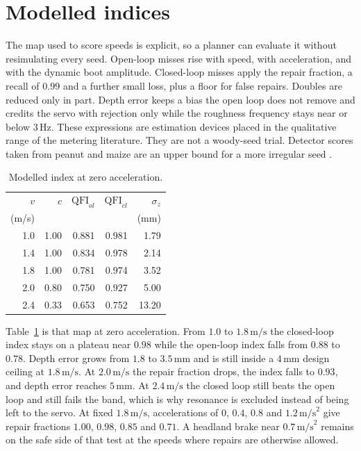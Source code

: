 \documentclass[11pt,a4paper]{article}
\begin{document}
\section{Modelled indices}
The map used to score speeds is explicit, so a planner can evaluate it without resimulating every seed. Open-loop misses rise with speed, with acceleration, and with the dynamic boot amplitude. Closed-loop misses apply the repair fraction, a recall of \(0.99\) and a further small loss, plus a floor for false repairs. Doubles are reduced only in part. Depth error keeps a bias the open loop does not remove and credits the servo with rejection only while the roughness frequency stays near or below \(3\,\mathrm{Hz}\). These expressions are estimation devices placed in the qualitative range of the metering literature. They are not a woody-seed trial. Detector scores taken from peanut and maize are an upper bound for a more irregular seed \cite{blaser2024,zhao2025yolo}.

\begin{table}[t]
\centering
\caption{Modelled index at zero acceleration.}
\label{tab:qfi}
\begin{tabular}{@{}rrrrr@{}}
\toprule
\(v\) & \(c\) & \(\mathrm{QFI}_{ol}\) & \(\mathrm{QFI}_{cl}\) & \(\sigma_z\) \\
(m/s) & & & & (mm) \\
\midrule
1.0 & 1.00 & 0.881 & 0.981 & 1.79 \\
1.4 & 1.00 & 0.834 & 0.978 & 2.14 \\
1.8 & 1.00 & 0.781 & 0.974 & 3.52 \\
2.0 & 0.80 & 0.750 & 0.927 & 5.00 \\
2.4 & 0.33 & 0.653 & 0.752 & 13.20 \\
\bottomrule
\end{tabular}
\end{table}

Table~\ref{tab:qfi} is that map at zero acceleration. From \(1.0\) to \(1.8\,\mathrm{m/s}\) the closed-loop index stays on a plateau near \(0.98\) while the open-loop index falls from \(0.88\) to \(0.78\). Depth error grows from \(1.8\) to \(3.5\,\mathrm{mm}\) and is still inside a \(4\,\mathrm{mm}\) design ceiling at \(1.8\,\mathrm{m/s}\). At \(2.0\,\mathrm{m/s}\) the repair fraction drops, the index falls to \(0.93\), and depth error reaches \(5\,\mathrm{mm}\). At \(2.4\,\mathrm{m/s}\) the closed loop still beats the open loop and still fails the band, which is why resonance is excluded instead of being left to the servo. At fixed \(1.8\,\mathrm{m/s}\), accelerations of \(0\), \(0.4\), \(0.8\) and \(1.2\,\mathrm{m/s}^2\) give repair fractions \(1.00\), \(0.98\), \(0.85\) and \(0.71\). A headland brake near \(0.7\,\mathrm{m/s}^2\) remains on the safe side of that test at the speeds where repairs are otherwise allowed.
\end{document}
